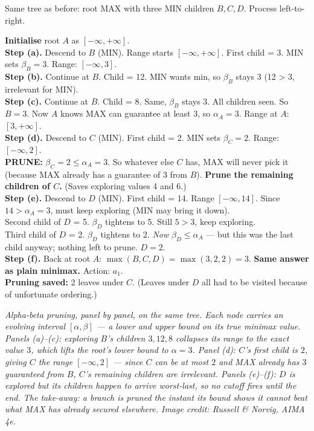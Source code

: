 \documentclass[11pt, a4paper]{article}
\begin{document}
Same tree as before: root MAX with three MIN children $B, C, D$. Process left-to-right.

\begin{exbox}
\textbf{Initialise} root $A$ as $[-\infty, +\infty]$.\\[0.3em]
\textbf{Step (a).} Descend to $B$ (MIN). Range starts $[-\infty, +\infty]$. First child = 3. MIN sets $\beta_B = 3$. Range: $[-\infty, 3]$.\\[0.3em]
\textbf{Step (b).} Continue at $B$. Child = 12. MIN wants min, so $\beta_B$ stays 3 (12 > 3, irrelevant for MIN).\\[0.3em]
\textbf{Step (c).} Continue at $B$. Child = 8. Same, $\beta_B$ stays 3. All children seen. So $B = 3$. Now $A$ knows MAX can guarantee at least 3, so $\alpha_A = 3$. Range at $A$: $[3, +\infty]$.\\[0.3em]
\textbf{Step (d).} Descend to $C$ (MIN). First child = 2. MIN sets $\beta_C = 2$. Range: $[-\infty, 2]$. \\[0.3em]
\textbf{PRUNE:} $\beta_C = 2 \le \alpha_A = 3$. So whatever else $C$ has, MAX will never pick it (because MAX already has a guarantee of 3 from $B$). \textbf{Prune the remaining children of $C$.} (Saves exploring values 4 and 6.)\\[0.3em]
\textbf{Step (e).} Descend to $D$ (MIN). First child = 14. Range $[-\infty, 14]$. Since $14 > \alpha_A = 3$, must keep exploring (MIN may bring it down).\\[0.3em]
Second child of $D$ = 5. $\beta_D$ tightens to 5. Still $5 > 3$, keep exploring.\\[0.3em]
Third child of $D$ = 2. $\beta_D$ tightens to 2. \emph{Now} $\beta_D \le \alpha_A$ — but this was the last child anyway; nothing left to prune. $D = 2$.\\[0.3em]
\textbf{Step (f).} Back at root $A$: $\max(B, C, D) = \max(3, 2, 2) = 3$. \textbf{Same answer as plain minimax.} Action: $a_1$.\\[0.3em]
\textbf{Pruning saved:} 2 leaves under $C$. (Leaves under $D$ all had to be visited because of unfortunate ordering.)
\end{exbox}

\begin{center}

\footnotesize\textit{Alpha-beta pruning, panel by panel, on the same tree. Each node carries an evolving interval $[\alpha,\beta]$ --- a lower and upper bound on its true minimax value. Panels (a)--(c): exploring $B$'s children $3,12,8$ collapses its range to the exact value $3$, which lifts the root's lower bound to $\alpha=3$. Panel (d): $C$'s first child is $2$, giving $C$ the range $[-\infty,2]$ --- since $C$ can be at most $2$ and MAX already has $3$ guaranteed from $B$, $C$'s remaining children are irrelevant. Panels (e)--(f): $D$ is explored but its children happen to arrive worst-last, so no cutoff fires until the end. The take-away: a branch is pruned the instant its bound shows it cannot beat what MAX has already secured elsewhere. Image credit: Russell \& Norvig, AIMA 4e.}
\end{center}
\end{document}
